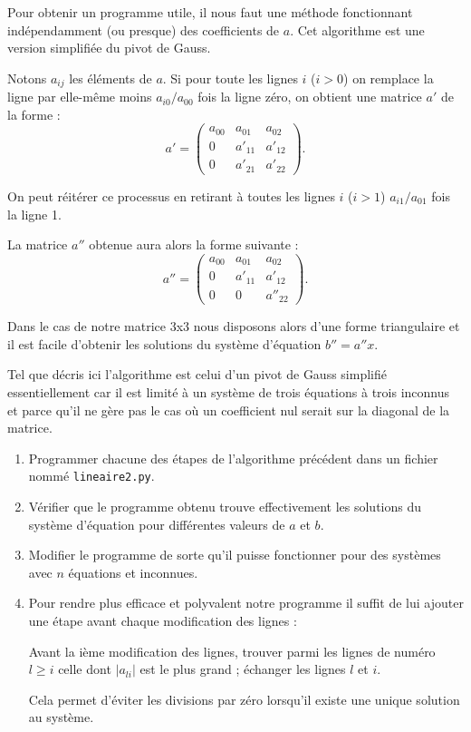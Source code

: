  Pour obtenir un programme utile, il nous faut une méthode fonctionnant
 indépendamment (ou presque) des coefficients de $a$. Cet algorithme
 est une version simplifiée du pivot de Gauss.

 Notons $a_{ij}$ les éléments de $a$. Si pour toute les lignes $i$ ($i>0$)
 on remplace la ligne par elle-même moins $a_{i0}/a_{00}$ fois la ligne zéro,
 on obtient une matrice $a'$ de la forme :
 \[
   a' = \left(
     \begin{array}{ccc}
       a_{00} & a_{01} & a_{02} \\
       0 & a'_{11} & a'_{12} \\
       0 & a'_{21} & a'_{22}       
     \end{array}
   \right).
 \]

 On peut réitérer ce processus en retirant à toutes les lignes $i$ ($i>1$)
 $a_{i1}/a_{01}$ fois la ligne 1.

 La matrice $a''$ obtenue aura alors la forme suivante :
  \[
   a'' = \left(
     \begin{array}{ccc}
       a_{00} & a_{01} & a_{02} \\
       0 & a'_{11} & a'_{12} \\
       0 & 0 & a''_{22}        
     \end{array}
   \right).
 \]

 Dans le cas de notre matrice 3x3 nous disposons alors d'une forme triangulaire et il est facile d'obtenir
 les solutions du système d'équation $b''=a''x$.

 Tel que décris ici l'algorithme est celui d'un pivot de Gauss simplifié essentiellement
 car il est limité à un système de trois
 équations à trois inconnus et parce qu'il ne gère pas le cas où un coefficient nul serait sur la diagonal de la matrice. 

 \begin{enumerate}
 \item Programmer chacune des étapes de l'algorithme précédent dans un fichier nommé \verb+lineaire2.py+.
 \item Vérifier que le programme obtenu trouve effectivement les solutions du système
   d'équation pour différentes valeurs de $a$ et $b$.
 \item {\sc[Facultatif :]} Modifier le programme de sorte qu'il puisse
   fonctionner pour des systèmes avec $n$ équations et inconnues.
 \item {\sc[Facultatif :]} Pour rendre plus efficace et polyvalent notre programme il suffit de lui ajouter
   une étape avant chaque modification des lignes :

   Avant la ième modification
   des lignes, trouver parmi les lignes de numéro $l\geq i$ celle dont $|a_{li}|$ est le plus grand ; échanger
   les lignes $l$ et $i$.

   Cela permet d'éviter les divisions par zéro
   lorsqu'il existe une unique solution au système. 
 \end{enumerate}



\pagebreak
